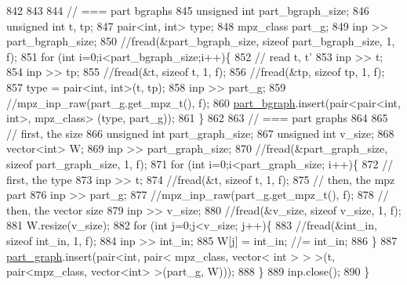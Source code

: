 \begin{DoxyCode}
842 
843 
844   \textcolor{comment}{// === part bgraphs}
845   \textcolor{keywordtype}{unsigned} \textcolor{keywordtype}{int} part\_bgraph\_size;
846   \textcolor{keywordtype}{unsigned} \textcolor{keywordtype}{int} t, tp;
847   pair<int, int> type; 
848   mpz\_class part\_g;
849   inp >> part\_bgraph\_size;
850   \textcolor{comment}{//fread(&part\_bgraph\_size, sizeof part\_bgraph\_size, 1, f);}
851   \textcolor{keywordflow}{for} (\textcolor{keywordtype}{int} i=0;i<part\_bgraph\_size;i++)\{
852     \textcolor{comment}{// read t, t'}
853     inp >> t;
854     inp >> tp;
855     \textcolor{comment}{//fread(&t, sizeof t, 1, f);}
856     \textcolor{comment}{//fread(&tp, sizeof tp, 1, f);}
857     type = pair<int, int>(t, tp);
858     inp >> part\_g;
859     \textcolor{comment}{//mpz\_inp\_raw(part\_g.get\_mpz\_t(), f);}
860     \hyperlink{classmarked__graph__compressed_a7b3267063fba30b45eb21b3ba4e07536}{part\_bgraph}.insert(pair<pair<int, int>, mpz\_class> (type, part\_g));
861   \}
862 
863   \textcolor{comment}{// === part graphs}
864 
865   \textcolor{comment}{// first, the size}
866   \textcolor{keywordtype}{unsigned} \textcolor{keywordtype}{int} part\_graph\_size;
867   \textcolor{keywordtype}{unsigned} \textcolor{keywordtype}{int} v\_size;
868   vector<int> W; 
869   inp >> part\_graph\_size;
870   \textcolor{comment}{//fread(&part\_graph\_size, sizeof part\_graph\_size, 1, f);}
871   \textcolor{keywordflow}{for} (\textcolor{keywordtype}{int} i=0;i<part\_graph\_size; i++)\{
872     \textcolor{comment}{// first, the type}
873     inp >> t; 
874     \textcolor{comment}{//fread(&t, sizeof t, 1, f);}
875     \textcolor{comment}{// then, the mpz part}
876     inp >> part\_g;
877     \textcolor{comment}{//mpz\_inp\_raw(part\_g.get\_mpz\_t(), f);}
878     \textcolor{comment}{// then, the vector size}
879     inp >> v\_size;
880     \textcolor{comment}{//fread(&v\_size, sizeof v\_size, 1, f);}
881     W.resize(v\_size);
882     \textcolor{keywordflow}{for} (\textcolor{keywordtype}{int} j=0;j<v\_size; j++)\{
883       \textcolor{comment}{//fread(&int\_in, sizeof int\_in, 1, f);}
884       inp >> int\_in;
885       W[j] = int\_in; \textcolor{comment}{//= int\_in;}
886     \}
887     \hyperlink{classmarked__graph__compressed_ae179a4737e6eab905c18a94d44ef64b7}{part\_graph}.insert(pair<\textcolor{keywordtype}{int}, pair< mpz\_class, vector< int > > >(t, pair<mpz\_class, vector<int>
       >(part\_g, W)));
888   \}
889   inp.close();
890 \}
\end{DoxyCode}
\mbox{\label{classmarked__graph__compressed_ab9cdb7fc43badd58fb5202f74ffac723}} 

